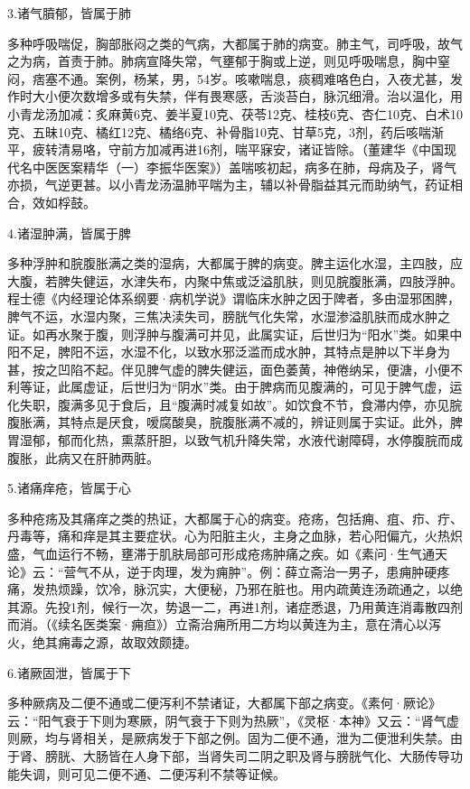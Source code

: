 \documentclass[draft,12pt]{ctexbook}
\begin{document}
3.诸气膹郁，皆属于肺

多种呼吸喘促，胸部胀闷之类的气病，大都属于肺的病变。肺主气，司呼吸，故气之为病，首责于肺。肺病宣降失常，气壅郁于胸或上逆，则见呼吸喘息，胸中窒闷，痞塞不通。案例，杨某，男，54岁。咳嗽喘息，痰稠难咯色白，入夜尤甚，发作时大小便次数增多或有失禁，伴有畏寒感，舌淡苔白，脉沉细滑。治以温化，用小青龙汤加减：炙麻黄6克、姜半夏10克、茯苓12克、桂枝6克、杏仁10克、白术10克、五昧10克、橘红12克、橘络6克、补骨脂10克、甘草5克，3剂，药后咳喘渐平，疲转清易咯，守前方加减再进16剂，喘平寐安，诸证皆除。（董建华《中国现代名中医医案精华（一）李振华医案》）盖喘咳初起，病多在肺，母病及子，肾气亦损，气逆更甚。以小青龙汤温肺平喘为主，辅以补骨脂益其元而助纳气，药证相合，效如桴鼓。

4.诸湿肿满，皆属于脾

多种浮肿和脘腹胀满之类的湿病，大都属于脾的病变。脾主运化水湿，主四肢，应大腹，若脾失健运，水津失布，内聚中焦或泛溢肌肤，则见脘腹胀满，四肢浮肿。程士德《内经理论体系纲要·病机学说》谓临床水肿之因于陴者，多由湿邪困脾，脾气不运，水湿内聚，三焦决渎失司，膀胱气化失常，水湿渗溢肌肤而成水肿之证。如再水聚于腹，则浮肿与腹满可并见，此属实证，后世归为“阳水”类。如果中阳不足，脾阳不运，水湿不化，以致水邪泛滥而成水肿，其特点是肿以下半身为甚，按之凹陷不起。伴见脾气虚的脾失健运，面色萎黄，神倦纳呆，便溏，小便不利等证，此属虚证，后世归为“阴水”类。由于脾病而见腹满的，可见于脾气虚，运化失职，腹满多见于食后，且“腹满时减复如故”。如饮食不节，食滞内停，亦见脘腹胀满，其特点是厌食，嗳腐酸臭，脘腹胀满不减的，辨证则属于实证。此外，脾胃湿郁，郁而化热，熏蒸肝胆，以致气机升降失常，水液代谢障碍，水停腹脘而成腹胀，此病又在肝肺两脏。

5.诸痛痒疮，皆属于心

多种疮疡及其痛痒之类的热证，大都属于心的病变。疮疡，包括痈、疽、疖、疔、丹毒等，痛和痒是其主要症状。心为阳脏主火，主身之血脉，若心阳偏亢，火热炽盛，气血运行不畅，壅滞于肌肤局部可形成疮疡肿痛之疾。如《素问·生气通天论》云：“营气不从，逆于肉理，发为痈肿”。例：薛立斋治一男子，患痈肿硬疼痛，发热烦躁，饮冷，脉沉实，大便秘，乃邪在脏也。用内疏黄连汤疏通之，以绝其源。先投1剂，候行一次，势退一二，再进1剂，诸症悉退，乃用黄连消毒散四剂而消。（《续名医类案·痈疸》）立斋治痈所用二方均以黄连为主，意在清心以泻火，绝其痈毒之源，故取效颇捷。

6.诸厥固泄，皆属于下

多种厥病及二便不通或二便泻利不禁诸证，大都属下部之病变。《素何·厥论》云：“阳气衰于下则为寒厥，阴气衰于下则为热厥”，《灵枢·本神》又云：“肾气虚则厥，均与肾相关，是厥病发于下部之例。固为二便不通，泄为二便泄利失禁。由于肾、膀胱、大肠皆在人身下部，当肾失司二阴之职及肾与膀胱气化、大肠传导功能失调，则可见二便不通、二便泻利不禁等证候。
\end{document}
